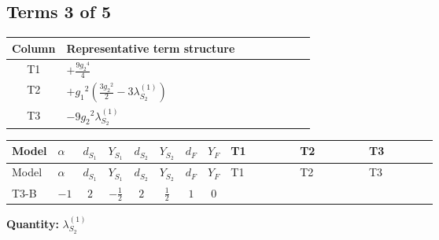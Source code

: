 \documentclass[8pt]{article}
\begin{document}
\begin{landscape}
\subsection*{Terms 3 of 5}
\begin{center}
\begin{tabular}{@{}c >{\raggedright\arraybackslash}p{0.82\linewidth}@{}}
\toprule
Column & Representative term structure \\
\midrule
T1 & \(\displaystyle +\frac{9 {g_2}^4}{4}\) \\
\midrule
T2 & \(\displaystyle +{g_1}^2 \left(\frac{3 {g_2}^2}{2}-3 {\lambda_{S_2}^{(1)}}\right)\) \\
\midrule
T3 & \(\displaystyle -9 {g_2}^2 {\lambda_{S_2}^{(1)}}\) \\
\midrule
\bottomrule
\end{tabular}
\end{center}
\smallskip
\tiny
\begin{longtable}{@{}llcccccc >{\raggedright\arraybackslash}p{0.21\linewidth} >{\raggedright\arraybackslash}p{0.21\linewidth} >{\raggedright\arraybackslash}p{0.21\linewidth}@{}}
\toprule
Model & $\alpha$ & $d_{S_1}$ & $Y_{S_1}$ & $d_{S_2}$ & $Y_{S_2}$ & $d_F$ & $Y_F$ & T1 & T2 & T3 \\
\midrule
\endfirsthead
\toprule
Model & $\alpha$ & $d_{S_1}$ & $Y_{S_1}$ & $d_{S_2}$ & $Y_{S_2}$ & $d_F$ & $Y_F$ & T1 & T2 & T3 \\
\midrule
\endhead
T3-B & $-1$ & $2$ & $-\frac{1}{2}$ & $2$ & $\frac{1}{2}$ & $1$ & $0$ & \scriptsize\adjustbox{max width=\linewidth}{$\begin{gathered} +\frac{9 {g_2}^4}{4}\end{gathered}$} & \scriptsize\adjustbox{max width=\linewidth}{$\begin{gathered} +{g_1}^2 \left(\frac{3 {g_2}^2}{2}-3 {\lambda_{S_2}^{(1)}}\right)\end{gathered}$} & \scriptsize\adjustbox{max width=\linewidth}{$\begin{gathered} -9 {g_2}^2 {\lambda_{S_2}^{(1)}}\end{gathered}$} \\
\midrule
\bottomrule
\end{longtable}
\clearpage
\noindent\textbf{Quantity: }$\lambda_{S_2}^{(1)}$\par\smallskip

\end{landscape}
\end{document}
